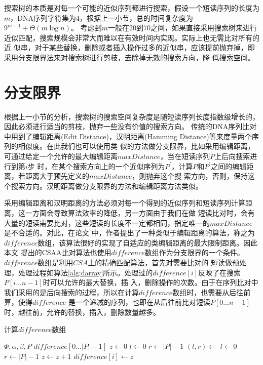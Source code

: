 搜索树的本质是对每一个可能的近似序列都进行搜索，假设一个短读序列的长度为$m$，DNA序列字符集为4，根据上一小节，总的时间复杂度为$9^{m-1}+\Theta(m\log n)$。
考虑到$m$一般在20到70之间，如果直接采用搜索树来进行近似匹配，搜索规模会非常大而难以在有效时间内实现。实际上也无需比对所有的近
似串，对于某些替换，删除或者插入操作过多的近似串，应该提前抛弃掉，即采用分支限界法来对搜索树进行剪枝，去除掉无效的搜索方向，降
低搜索空间。

\section{分支限界}

根据上一小节的分析，搜索树的搜索空间复杂度是随短读序列长度指数级增长的，因此必须进行适当的剪枝，抛弃一些没有价值的搜索方向。
传统的DNA序列比对中用到了编辑距离(Edit Distance)，汉明距离(Hamming Distance)等来度量两个序列的相似度。在此我们也可以使用类
似的方法做分支限界，比如采用编辑距离，可通过给定一个允许的最大编辑距离$maxDistance$，当在短读序列$P$上后向搜索进行到第$i$步
时，在某个搜索方向上的一个近似序列为$P^{'}$，计算$P$和$P^{'}$之间的编辑距离，若距离大于预先定义的$maxDistance$，则抛弃这个搜
索方向，否则，保持这个搜索方向。汉明距离做分支限界的方法和编辑距离方法类似。

采用编辑距离和汉明距离的方法必须对每一个得到的近似序列和短读序列计算距离，这一方面会导致算法效率的降低，另一方面由于我们在做
短读比对时，会有大量的短读需要比对，这些短读的长度不一定都相同，指定唯一的$maxDistance$是不合适的。对此，在论文\cite{li2009fast}
中，作者提出了一种类似于编辑距离的算法，称之为$difference$数组，该算法很好的实现了自适应的类编辑距离的最大限制距离。因此本文
提出的CSAA比对算法也使用$difference$数组作为分支限界的一个条件。$difference$数组是利用$CSA$上的精确匹配算法，首先对需要比对的
短读做预处理，处理过程如算法\ref{alg:darray}所示。处理过的$difference[i]$反映了在搜索$P[i\ldots n-1]$时可以允许的最大替换，插
入，删除操作的次数。由于在序列比对中我们采用的是后向搜索的过程，所以在计算$difference$数组时，也需要从后往前算，使得$difference$
是一个递减的序列，也即在从后往前比对短读$P[0\ldots n-1]$时，越往前，允许的替换，插入，删除数量越多。

\begin{algorithm}
    \caption{计算$difference$数组}
    \label{alg:darray}
    \begin{algorithmic}[1]
        \Require $\Phi,\alpha,\beta,P$
        \Ensure $difference[0\ldots |P|-1]$
            \State $z \gets 0$
            \State $l \gets 0$
            \State $r \gets |P|-1$
                \State $(l,r) \gets$  
                \State $l\gets 0$
                \State $r \gets |P|-1$
                \State $z \gets z+1$
                \EndIf
                \State $difference[i] \gets z$
            \EndFor
        \EndFunction
    \end{algorithmic}
\end{algorithm}

